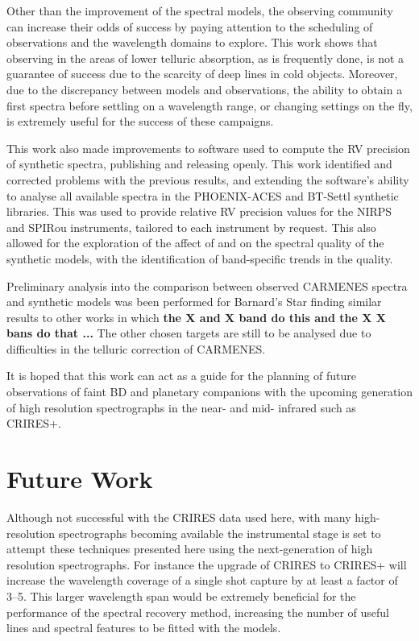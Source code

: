 Other than the improvement of the spectral models, the observing community can increase their odds of success by paying attention to the scheduling of observations and the wavelength domains to explore.
This work shows that observing in the areas of lower telluric absorption, as is frequently done, is not a guarantee of success due to the scarcity of deep lines in cold objects.
Moreover, due to the discrepancy between models and observations, the ability to obtain a first spectra before settling on a wavelength range, or changing settings on the fly, is extremely useful for the success of these campaigns.


This work also made improvements to software used to compute the {RV} precision of synthetic spectra, publishing and releasing \eniric{} openly.
This work identified and corrected problems with the previous results, and extending the software's ability to analyse all available spectra in the {PHOENIX-ACES} and {BT-Settl} synthetic libraries.
This was used to provide relative {RV} precision values for the {NIRPS} and {SPIRou} instruments, tailored to each instrument by request.
This also allowed for the exploration of the affect of \Logg and \feh{} on the spectral quality of the synthetic models, with the identification of band-specific trends in the quality.

Preliminary analysis into the comparison between observed {CARMENES} spectra and synthetic models was been performed for Barnard's Star finding similar results to other works in which \textbf{the X and X band do this and the X X bans do that ...}\todo{} The other chosen targets are still to be analysed due to difficulties in the telluric correction of {CARMENES}.

It is hoped that this work can act as a guide for the planning of future observations of faint {BD} and planetary companions with the upcoming generation of high resolution spectrographs in the near- and mid- infrared such as CRIRES+.


\section{Future Work}
\label{subsec:future}

Although not successful with the CRIRES data used here, with many high-resolution \nir{} spectrographs becoming available the instrumental stage is set to attempt these techniques presented here using the next-generation of high resolution spectrographs.
For instance the upgrade of CRIRES to CRIRES+ will increase the wavelength coverage of a single shot capture by at least a factor of 3--5.
This larger wavelength span would be extremely beneficial for the \textchisquared{} performance of the spectral recovery method, increasing the number of useful lines and spectral features to be fitted with the models.

